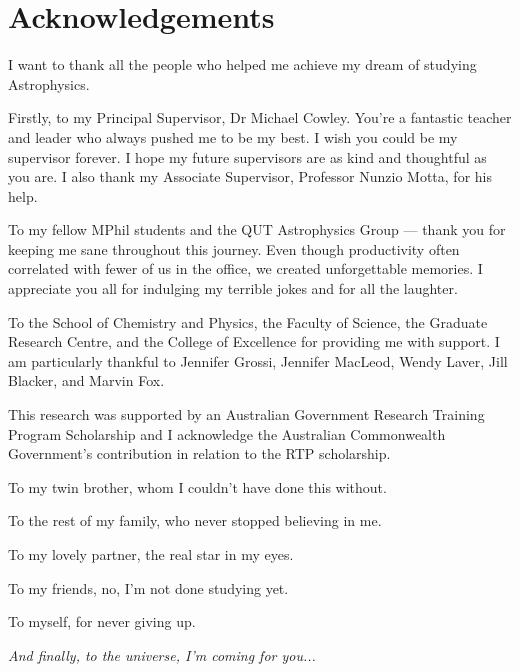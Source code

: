 \chapter{Acknowledgements}
\thispagestyle{empty}

I want to thank all the people who helped me achieve my dream of studying Astrophysics.
\vspace{1em}

\noindent Firstly, to my Principal Supervisor, Dr Michael Cowley. You're a fantastic teacher and leader who always pushed me to be my best. I wish you could be my supervisor forever. I hope my future supervisors are as kind and thoughtful as you are. I also thank my Associate Supervisor, Professor Nunzio Motta, for his help. 
\vspace{1em}

\noindent To my fellow MPhil students and the QUT Astrophysics Group --- thank you for keeping me sane throughout this journey. Even though productivity often correlated with fewer of us in the office, we created unforgettable memories. I appreciate you all for indulging my terrible jokes and for all the laughter.
\vspace{1em}

\noindent To the School of Chemistry and Physics, the Faculty of Science, the Graduate Research Centre, and the College of Excellence for providing me with support. I am particularly thankful to Jennifer Grossi, Jennifer MacLeod, Wendy Laver, Jill Blacker, and Marvin Fox.

\noindent This research was supported by an Australian Government Research Training Program Scholarship and I acknowledge the Australian Commonwealth Government’s contribution in relation to the RTP scholarship.
\vspace{0.5em}

\noindent To my twin brother, whom I couldn't have done this without.
\vspace{0.5em}

\noindent To the rest of my family, who never stopped believing in me.
\vspace{0.5em}

\noindent To my lovely partner, the real star in my eyes. 
\vspace{0.5em}

\noindent To my friends, no, I'm not done studying yet.
\vspace{0.5em}

\noindent To myself, for never giving up.
\vspace{0.5em}

\begin{center}
    \textit{And finally, to the universe, I'm coming for you...}
\end{center}